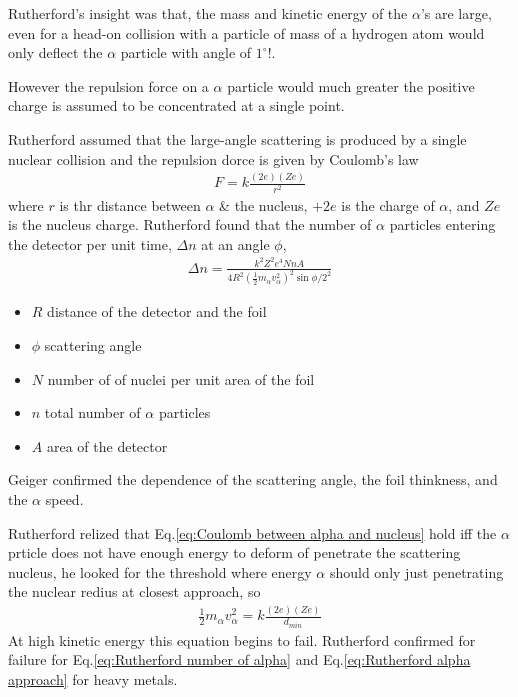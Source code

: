         \bulletpar Rutherford's insight was that, the mass and kinetic energy of the $\alpha$'s are large, even for a head-on collision with a particle of mass of a hydrogen
        atom would only deflect the $\alpha$ particle with angle of $1^\circ$!. 

        \bulletpar However the repulsion force on a $\alpha$ particle would much greater the positive charge is assumed to be concentrated at a single point.

        \bulletpar Rutherford assumed that the large-angle scattering is produced by a single nuclear collision and the repulsion dorce is given by Coulomb's law
        \begin{align}
            \label{eq:Coulomb between alpha and nucleus}
            F = k \frac{(2e)(Ze)}{r^2}
        \end{align}
        where $r$ is thr distance between $\alpha$ \& the nucleus, $+2e$ is the charge of $\alpha$, and $Ze$ is the nucleus charge. Rutherford found that the number of 
        $\alpha$ particles entering the detector per unit time, $\Delta{n}$ at an angle $\phi$,
        \begin{align}
            \label{eq:Rutherford number of alpha}
            \Delta{n} = \frac{k^2 Z^2 e^4 N n A}{4R^2 (\frac{1}{2}m_\alpha v_\alpha^2)^2 \sin{\phi/2}^2}
        \end{align}
        {\tiny \begin{itemize}
            \item $R$ distance of the detector and the foil
            \item $\phi$ scattering angle
            \item $N$ number of of nuclei per unit area of the foil
            \item $n$ total number of $\alpha$ particles
            \item $A$ area of the detector
        \end{itemize}}
        Geiger confirmed the dependence of the scattering angle, the foil thinkness, and the $\alpha$ speed.

        \bulletpar Rutherford relized that Eq.\eqref{eq:Coulomb between alpha and nucleus} hold iff the $\alpha$ prticle does not have enough energy to deform of penetrate
        the scattering nucleus, he looked for the threshold where energy $\alpha$ should only just penetrating the nuclear redius at closest approach, so
        \begin{align}
            \label{eq:Rutherford alpha approach}
            \frac{1}{2} m_\alpha v_\alpha^2 = k \frac{(2e)(Ze)}{d_{min}}
        \end{align}
        At high kinetic energy this equation begins to fail. Rutherford confirmed for failure for Eq.\eqref{eq:Rutherford number of alpha} and 
        Eq.\eqref{eq:Rutherford alpha approach} for heavy metals. 

